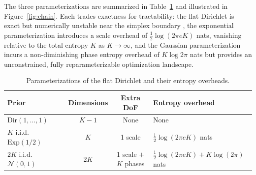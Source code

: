 \documentclass[11pt]{article}
\begin{document}
The three parameterizations are summarized in Table~\ref{tab:param}
and illustrated in Figure~\ref{fig:chain}.
Each trades exactness for tractability:
the flat Dirichlet is exact but numerically unstable near the simplex
boundary \cite{joo2020dirichlet},
the exponential parameterization introduces a scale overhead of
$\tfrac{1}{2}\log(2\pi eK)$ nats, vanishing relative to the total
entropy $K$ as $K\to\infty$, and
the Gaussian parameterization incurs a non-diminishing phase entropy
overhead of $K\log 2\pi$ nats but provides an unconstrained, fully
reparameterizable optimization landscape.
\begin{table}[h]
\centering
\begin{tabular}{lccl}
\hline
\textbf{Prior} & \textbf{Dimensions} & \textbf{Extra DoF} &
\textbf{Entropy overhead} \\
\hline
$\mathrm{Dir}(1,\ldots,1)$ & $K-1$ & None & None \\
$K$ i.i.d.\ $\mathrm{Exp}(1/2)$ & $K$ & 1 scale & $\tfrac{1}{2}\log(2\pi eK)$ nats \\
$2K$ i.i.d.\ $\mathcal{N}(0,1)$ & $2K$ & 1 scale $+$ $K$ phases &
$\tfrac{1}{2}\log(2\pi eK) + K\log(2\pi)$ nats \\
\hline
\end{tabular}
\caption{Parameterizations of the flat Dirichlet and their entropy overheads.}
\label{tab:param}
\end{table}
\end{document}
